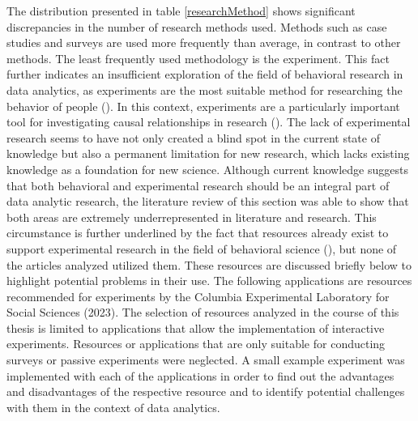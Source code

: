 
The distribution presented in table \ref{researchMethod} shows significant discrepancies in the number of research methods used. Methods such as case studies and surveys are used more frequently than average, in contrast to other methods. The least frequently used methodology is the experiment. This fact further indicates an insufficient exploration of the field of behavioral research in data analytics, as experiments are the most suitable method for researching the behavior of people (\cite{Gniewosz.2011}). In this context, experiments are a particularly important tool for investigating causal relationships in research (\cite{Gniewosz.2011}). The lack of experimental research seems to have not only created a blind spot in the current state of knowledge but also a permanent limitation for new research, which lacks existing knowledge as a foundation for new science. Although current knowledge suggests that both behavioral and experimental research should be an integral part of data analytic research, the literature review of this section was able to show that both areas are extremely underrepresented in literature and research. This circumstance is further underlined by the fact that resources already exist to support experimental research in the field of behavioral science (\cite{Columbia.2023}), but none of the articles analyzed utilized them. These resources are discussed briefly below to highlight potential problems in their use. The following applications are resources recommended for experiments by the Columbia Experimental Laboratory for Social Sciences (2023). The selection of resources analyzed in the course of this thesis is limited to applications that allow the implementation of interactive experiments. Resources or applications that are only suitable for conducting surveys or passive experiments were neglected. A small example experiment was implemented with each of the applications in order to find out the advantages and disadvantages of the respective resource and to identify potential challenges with them in the context of data analytics.

